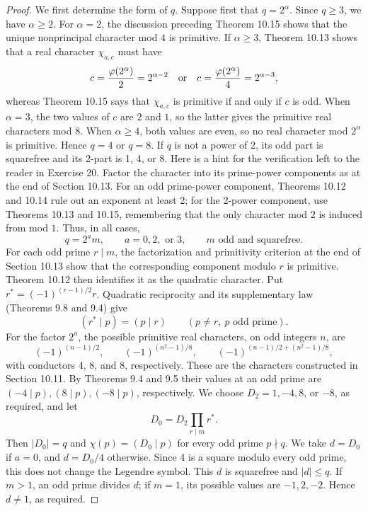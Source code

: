 \documentclass[11pt,twoside,leqno]{article}
\theoremstyle{apostol}
\newcommand{\ls}[2]{(#1\mid #2)}
\begin{document}
\begin{proof}
We first determine the form of \(q\). Suppose first that \(q=2^\alpha\).
Since \(q\ge3\), we have \(\alpha\ge2\). For \(\alpha=2\), the discussion
preceding Theorem 10.15 shows that the unique nonprincipal character mod \(4\)
is primitive. If \(\alpha\ge3\), Theorem 10.13 shows that a real character
\(\chi_{a,c}\) must have
\[
 c=\frac{\varphi(2^\alpha)}2=2^{\alpha-2}
 \quad\hbox{or}\quad
 c=\frac{\varphi(2^\alpha)}4=2^{\alpha-3},
\]
whereas Theorem 10.15 says that \(\chi_{a,c}\) is primitive if and only if
\(c\) is odd. When \(\alpha=3\), the two values of \(c\) are \(2\) and \(1\),
so the latter gives the primitive real characters mod \(8\). When
\(\alpha\ge4\), both values are even, so no real character mod \(2^\alpha\)
is primitive. Hence \(q=4\) or \(q=8\). If \(q\) is not a power of 2,
its odd part is squarefree and its 2-part is 1, 4, or 8. Here is a hint for
the verification left to the reader in Exercise 20. Factor the character into
its prime-power components as at the end of Section 10.13. For an odd
prime-power component, Theorems 10.12 and 10.14 rule out an exponent at least
2; for the 2-power component, use Theorems 10.13 and 10.15, remembering that
the only character mod \(2\) is induced from mod \(1\). Thus, in all cases,
\[
 q=2^a m,\qquad a=0,2,\text{ or }3,\qquad
 m\text{ odd and squarefree}.
\]
For each odd prime \(r\mid m\), the factorization and primitivity criterion at
the end of Section 10.13 show that the corresponding component modulo \(r\) is
primitive. Theorem 10.12 then identifies it as the quadratic character. Put
\(r^*=(-1)^{(r-1)/2}r\). Quadratic reciprocity and
its supplementary law (Theorems 9.8 and 9.4) give
\[
 \ls{r^*}p=\ls p r\qquad(p\ne r,\ p\text{ odd prime}).
\]
For the factor \(2^a\), the possible primitive real characters, on odd
integers \(n\), are
\[
 (-1)^{(n-1)/2},\qquad
 (-1)^{(n^2-1)/8},\qquad
 (-1)^{(n-1)/2+(n^2-1)/8},
\]
with conductors 4, 8, and 8, respectively. These are the characters
constructed in Section 10.11. By Theorems 9.4 and 9.5 their
values at an odd prime are \(\ls{-4}p,\ls8p,\ls{-8}p\), respectively.
We choose \(D_2=1,-4,8\), or \(-8\), as required, and let
\[
 D_0=D_2\prod_{r\mid m}r^*.
\]
Then \(|D_0|=q\) and \(\chi(p)=\ls{D_0}p\) for every odd prime \(p\nmid q\).
We take \(d=D_0\) if \(a=0\), and \(d=D_0/4\) otherwise. Since 4 is a
square modulo every odd prime, this does not change the Legendre symbol.
This \(d\) is squarefree and \(|d|\le q\). If \(m>1\), an odd prime
divides \(d\); if \(m=1\), its possible values are \(-1,2,-2\).
Hence \(d\ne1\), as required.
\end{proof}
\end{document}
